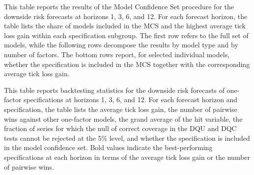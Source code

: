 \documentclass[12pt]{article}
\newcommand{\tablesdir}{tables}
\begin{document}
\clearpage
\begin{table}[!htbp]
\caption{\sc Model Confidence Set}\label{tbl:mcs}
\begin{center}
\begin{footnotesize}

\end{footnotesize}
\end{center}

	{\hspace{1em} \footnotesize This table reports the results of the Model Confidence Set procedure for the downside risk forecasts at horizons 1, 3, 6, and 12. For each forecast horizon, the table lists the share of models included in the MCS and the highest average tick loss gain within each specification subgroup. The first row refers to the full set of models, while the following rows decompose the results by model type and by number of factors. The bottom rows report, for selected individual models, whether the specification is included in the MCS together with the corresponding average tick loss gain.}

\end{table}

\clearpage
\begin{table}[!htbp]
	\caption{\sc Downside Risk Prediction Using One Factor}\label{tbl:oos:1fac}
	\vspace{-1em}
	\begin{center}
		\begin{tiny}
			
		\end{tiny}
	\end{center}

	{\hspace{1em} \footnotesize
	This table reports backtesting statistics for the downside risk forecasts of one-factor specifications at horizons 1, 3, 6, and 12.
	For each forecast horizon and specification, the table lists the average tick loss gain, the number of pairwise wins against other one-factor models,
	the grand average of the hit variable,
	the fraction of series for which the null of correct coverage in the DQU and DQC tests cannot be rejected at the 5\% level,
	and whether the specification is included in the model confidence set. Bold values indicate the best-performing specifications at each horizon in terms of the average tick loss gain or the number of pairwise wins.
	 }

\end{table}
\end{document}
